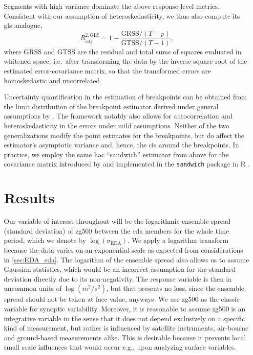 Segments with high variance dominate the above response-level metrics. Consistent with our assumption of heteroskedasticity, we thus also compute its
\gls{gls} analogue,
\begin{equation} \label{eq:R2GLS}
    R^{2,\mathrm{GLS}}_{\mathrm{adj}}
    = 1 - \frac{\mathrm{GRSS}/(T-p)}{\mathrm{GTSS}/(T-1)},
\end{equation}
where $\mathrm{GRSS}$ and $\mathrm{GTSS}$ are the residual and total
sums of squares evaluated in whitened space, i.e.\ after
transforming the data by the
inverse square-root of the estimated error-covariance matrix, so that
the transformed errors are homoskedastic and uncorrelated.

Uncertainty quantification in the estimation of breakpoints can be obtained from the limit distribution of the breakpoint estimator derived under general assumptions by \textcite{baiEstimatingMultipleBreaks1997, baiComputationAnalysisMultiple2003}. The framework notably also allows for autocorrelation and heteroskedasticity in the errors under mild assumptions. Neither of the two generalizations modify the point estimates for the breakpoints, but do affect the estimator's asymptotic variance and, hence, the \glspl{ci} around the breakpoints. In practice, we employ the same \gls{hac} \enquote{sandwich} estimator from above \parencite{whiteHeteroskedasticityconsistentCovarianceMatrix1980} for the covariance matrix introduced by \textcite{neweySimplePositiveSemidefinite1987, neweyAutomaticLagSelection1994} and implemented in the \texttt{sandwich} package in R \parencite{zeileisObjectorientedComputationSandwich2006, zeileisVariousVersatileVariances2020}.

\section{Results} \label{sec:EDA_res}

Our variable of interest throughout will be the logarithmic ensemble spread (standard deviation) of \gls{zg500} between the \gls{eda} members for the whole time period, which we denote by $\log(\sigma_{\mathrm{EDA}})$. We apply a logarithm transform because the data varies on an exponential scale as expected from considerations in \cref{sec:EDA_eda}. The logarithm of the ensemble spread also allows us to assume Gaussian statistics, which would be an incorrect assumption for the standard deviation directly due to its non-negativity. The response variable is then in uncommon units of $\log (m^2/s^2)$, but that presents no loss, since the ensemble spread should not be taken at face value, anyways. We use \gls{zg500} as the classic variable for synoptic variability. Moreover, it is reasonable to assume \gls{zg500} is an integrative variable in the sense that it does not depend exclusively on a specific kind of measurement, but rather is influenced by satellite instruments, air-bourne and ground-based measurements alike. This is desirable because it prevents local small scale influences that would occur e.g., upon analyzing surface variables.

